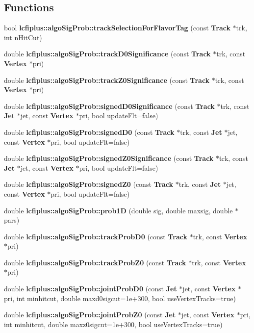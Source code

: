 \subsection*{Functions}
\begin{DoxyCompactItemize}
\item 
bool {\bf lcfiplus\-::algo\-Sig\-Prob\-::track\-Selection\-For\-Flavor\-Tag} (const {\bf Track} $\ast$trk, int n\-Hit\-Cut)
\item 
double {\bf lcfiplus\-::algo\-Sig\-Prob\-::track\-D0\-Significance} (const {\bf Track} $\ast$trk, const {\bf Vertex} $\ast$pri)
\item 
double {\bf lcfiplus\-::algo\-Sig\-Prob\-::track\-Z0\-Significance} (const {\bf Track} $\ast$trk, const {\bf Vertex} $\ast$pri)
\item 
double {\bf lcfiplus\-::algo\-Sig\-Prob\-::signed\-D0\-Significance} (const {\bf Track} $\ast$trk, const {\bf Jet} $\ast$jet, const {\bf Vertex} $\ast$pri, bool update\-Flt=false)
\item 
double {\bf lcfiplus\-::algo\-Sig\-Prob\-::signed\-D0} (const {\bf Track} $\ast$trk, const {\bf Jet} $\ast$jet, const {\bf Vertex} $\ast$pri, bool update\-Flt=false)
\item 
double {\bf lcfiplus\-::algo\-Sig\-Prob\-::signed\-Z0\-Significance} (const {\bf Track} $\ast$trk, const {\bf Jet} $\ast$jet, const {\bf Vertex} $\ast$pri, bool update\-Flt=false)
\item 
double {\bf lcfiplus\-::algo\-Sig\-Prob\-::signed\-Z0} (const {\bf Track} $\ast$trk, const {\bf Jet} $\ast$jet, const {\bf Vertex} $\ast$pri, bool update\-Flt=false)
\item 
double {\bf lcfiplus\-::algo\-Sig\-Prob\-::prob1\-D} (double sig, double maxsig, double $\ast$pars)
\item 
double {\bf lcfiplus\-::algo\-Sig\-Prob\-::track\-Prob\-D0} (const {\bf Track} $\ast$trk, const {\bf Vertex} $\ast$pri)
\item 
double {\bf lcfiplus\-::algo\-Sig\-Prob\-::track\-Prob\-Z0} (const {\bf Track} $\ast$trk, const {\bf Vertex} $\ast$pri)
\item 
double {\bf lcfiplus\-::algo\-Sig\-Prob\-::joint\-Prob\-D0} (const {\bf Jet} $\ast$jet, const {\bf Vertex} $\ast$pri, int minhitcut, double maxd0sigcut=1e+300, bool use\-Vertex\-Tracks=true)
\item 
double {\bf lcfiplus\-::algo\-Sig\-Prob\-::joint\-Prob\-Z0} (const {\bf Jet} $\ast$jet, const {\bf Vertex} $\ast$pri, int minhitcut, double maxz0sigcut=1e+300, bool use\-Vertex\-Tracks=true)

\end{DoxyCompactItemize}
